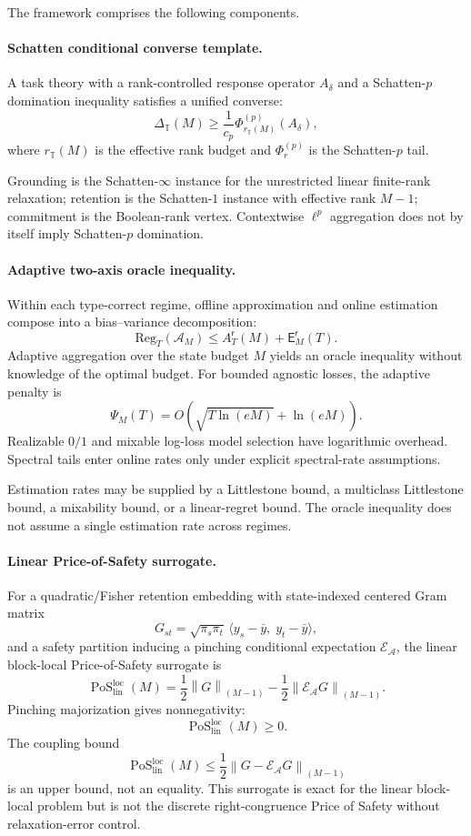 \documentclass[12pt]{article}
\theoremstyle{definition}
\DeclareMathOperator{\PoS}{PoS}
\newcommand{\Reg}{\mathrm{Reg}}
\newcommand{\Est}{\mathsf E}
\newcommand{\Aapp}{A_T}
\newcommand{\PsiAgg}{\Psi}
\newcommand{\EA}{\mathcal E_{\mathcal A}}
\newcommand{\KyF}[2]{\left\|#1\right\|_{(#2)}}
\newcommand{\PoSlin}{\PoS_{\mathrm{lin}}^{\mathrm{loc}}}
\begin{document}
The framework comprises the following components.

\paragraph{Schatten conditional converse template.}
A task theory with a rank-controlled response operator $A_\delta$ and a
Schatten-$p$ domination inequality satisfies a unified converse:
\[
\Delta_{\mathbb T}(M)
\ge
\frac1{c_p}
\Phi^{(p)}_{r_{\mathbb T}(M)}(A_\delta),
\]
where $r_{\mathbb T}(M)$ is the effective rank budget and
$\Phi^{(p)}_r$ is the Schatten-$p$ tail.

Grounding is the Schatten-$\infty$ instance for the unrestricted linear
finite-rank relaxation; retention is the Schatten-$1$ instance with effective
rank $M-1$; commitment is the Boolean-rank vertex.  Contextwise $\ell^p$
aggregation does not by itself imply Schatten-$p$ domination.

\paragraph{Adaptive two-axis oracle inequality.}
Within each type-correct regime, offline approximation and online estimation
compose into a bias--variance decomposition:
\[
\Reg_T(\mathcal A_M)
\le
\Aapp^{\mathsf r}(M)
+
\Est_M^{\mathsf r}(T).
\]
Adaptive aggregation over the state budget $M$ yields an oracle inequality
without knowledge of the optimal budget.  For bounded agnostic losses, the
adaptive penalty is
\[
\PsiAgg_M(T)
=
O\!\left(
\sqrt{T\ln(eM)}
+
\ln(eM)
\right).
\]
Realizable $0/1$ and mixable log-loss model selection have logarithmic
overhead.  Spectral tails enter online rates only under explicit spectral-rate
assumptions.

Estimation rates may be supplied by a Littlestone bound, a multiclass
Littlestone bound, a mixability bound, or a linear-regret bound.  The oracle
inequality does not assume a single estimation rate across regimes.

\paragraph{Linear Price-of-Safety surrogate.}
For a quadratic/Fisher retention embedding with state-indexed centered Gram
matrix
\[
G_{st}
=
\sqrt{\pi_s\pi_t}\,
\langle y_s-\bar y,\;y_t-\bar y\rangle,
\]
and a safety partition inducing a pinching conditional expectation
$\EA$, the linear block-local Price-of-Safety surrogate is
\[
\PoSlin(M)
=
\frac12\KyF{G}{M-1}
-
\frac12\KyF{\EA G}{M-1}.
\]
Pinching majorization gives nonnegativity:
\[
\PoSlin(M)\ge0.
\]
The coupling bound
\[
\PoSlin(M)
\le
\frac12\KyF{G-\EA G}{M-1}
\]
is an upper bound, not an equality.  This surrogate is exact for the linear
block-local problem but is not the discrete right-congruence Price of Safety
without relaxation-error control.
\end{document}

